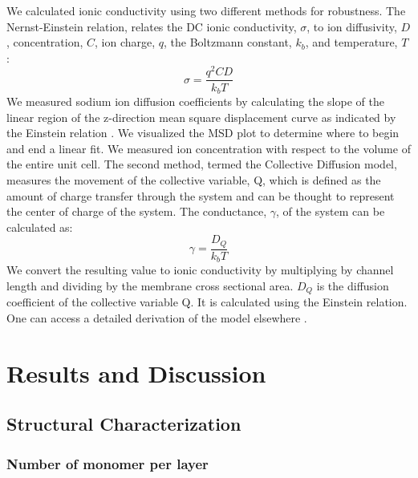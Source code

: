 \documentclass[journal=jpcbfk,manusciprt=article]{achemso}
\begin{document}
  We calculated ionic conductivity using two different methods for robustness.
  The Nernst-Einstein relation, relates the DC ionic conductivity, $\sigma$, to ion
  diffusivity, $D$, concentration, $C$, ion charge, $q$, the Boltzmann constant,
  $k_b$, and temperature, $T$: 
  \begin{equation}
	\sigma = \dfrac{q^2CD}{k_b T} 
	\label{eqn:nernst_einstein}
  \end{equation}
  We measured sodium ion diffusion coefficients by calculating the slope
  of the linear region of the z-direction mean square displacement curve as
  indicated by the Einstein relation \cite{einstein_investigations_1956}. We
  visualized the MSD plot to determine where to begin and end a linear fit. We
  measured ion concentration with respect to the volume of the entire unit cell. 
  The second method, termed the Collective Diffusion model, measures the
  movement of the collective variable, Q, which is defined as the amount of
  charge transfer through the system and can be thought to represent the center
  of charge of the system. The conductance, $\gamma$, of the system can be
  calculated as:
  \begin{equation}
	 \gamma = \dfrac{D_Q}{k_b T} 
	\label{eqn:collective_diffusion}
  \end{equation}
  We convert the resulting value to ionic conductivity by multiplying by
  channel length and dividing by the membrane cross sectional area. $D_Q$ is the
  diffusion coefficient of the collective variable Q. It is calculated using the
  Einstein relation. One can access a detailed derivation of the model elsewhere
  \cite{liu_collective_2013}.

  \section{Results and Discussion}
  
  \subsection{Structural Characterization}
  
  \subsubsection{Number of monomer per layer}
\end{document}
